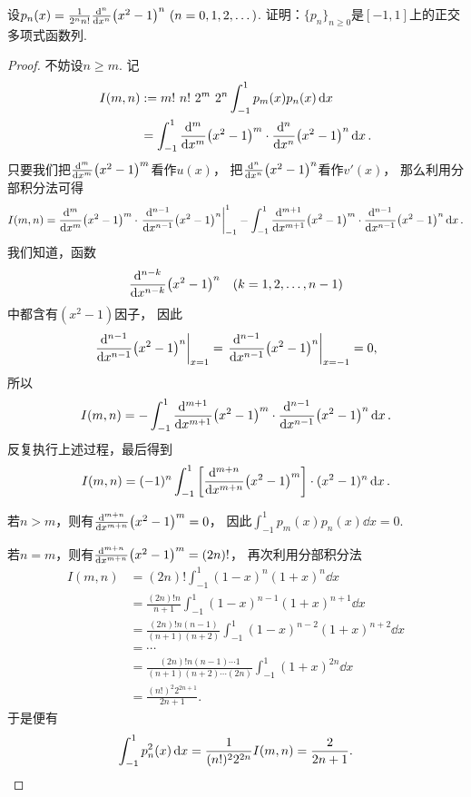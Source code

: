 \begin{example}
设\(p_n(x) = \frac1{2^n n!} \dv[n]{x} (x^2-1)^n\ (n=0,1,2,\dotsc)\).
证明：\(\{p_n\}_{n\geq0}\)是\([-1,1]\)上的正交多项式函数列.
\begin{proof}
不妨设\(n \geq m\).
记\begin{align*}
	I(m,n) &:= m! ~ n! ~ 2^m ~ 2^n \int_{-1}^1 p_m(x) p_n(x) \dd{x} \\
	&= \int_{-1}^1 \dv[m]{x} (x^2-1)^m \cdot \dv[n]{x} (x^2-1)^n \dd{x}.
\end{align*}
只要我们把\(\dv[m]{x} (x^2-1)^m\)看作\(u(x)\)，
把\(\dv[n]{x} (x^2-1)^n\)看作\(v'(x)\)，
那么利用分部积分法可得\begin{align*}
	I(m,n) = \dv[m]{x} (x^2-1)^m
		\cdot \eval{\dv[n-1]{x} (x^2-1)^n}_{-1}^1
		- \int_{-1}^1 \dv[m+1]{x} (x^2-1)^m
			\cdot \dv[n-1]{x} (x^2-1)^n \dd{x}.
\end{align*}
我们知道，函数\[
	\dv[n-k]{x} (x^2-1)^n
	\quad(k=1,2,\dotsc,n-1)
\]中都含有\((x^2-1)\)因子，
因此\[
	\eval{\dv[n-1]{x} (x^2-1)^n}_{x=1}
	= \eval{\dv[n-1]{x} (x^2-1)^n}_{x=-1}
	= 0,
\]
所以\[
	I(m,n) = - \int_{-1}^1 \dv[m+1]{x} (x^2-1)^m
					\cdot \dv[n-1]{x} (x^2-1)^n \dd{x}.
\]
反复执行上述过程，最后得到\[
	I(m,n) = (-1)^n \int_{-1}^1 \left[\dv[m+n]{x} (x^2-1)^m\right] \cdot (x^2-1)^n \dd{x}.
\]

若\(n>m\)，则有\(\dv[m+n]{x} (x^2-1)^m = 0\)，
因此\(\int_{-1}^1 p_m(x) p_n(x) \dd{x} = 0\).

若\(n=m\)，则有\(\dv[m+n]{x} (x^2-1)^m = (2n)!\)，
再次利用分部积分法\begin{align*}
	I(m,n) &= (2n)! \int_{-1}^1 (1-x)^n (1+x)^n \dd{x} \\
	&= \frac{(2n)! n}{n+1} \int_{-1}^1 (1-x)^{n-1} (1+x)^{n+1} \dd{x} \\
	&= \frac{(2n)! n(n-1)}{(n+1)(n+2)} \int_{-1}^1 (1-x)^{n-2} (1+x)^{n+2} \dd{x} \\
	&= \dotsb \\
	&= \frac{(2n)! n(n-1)\dotsm1}{(n+1)(n+2)\dotsm(2n)} \int_{-1}^1 (1+x)^{2n} \dd{x} \\
	&= \frac{(n!)^2 2^{2n+1}}{2n+1}.
\end{align*}
于是便有\[
	\int_{-1}^1 p_n^2(x) \dd{x}
	= \frac1{(n!)^2 2^{2n}} I(m,n)
	= \frac2{2n+1}.
	\qedhere
\]
\end{proof}
\end{example}

